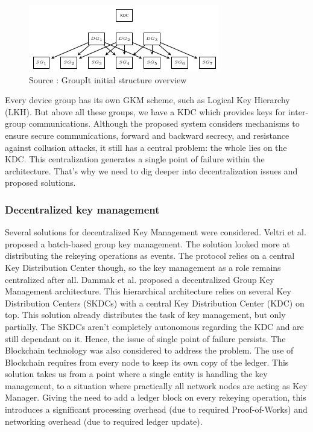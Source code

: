 \begin{figure}[htbp]
	\centerline{\includegraphics[scale=0.75]{figures/groupit.png}}
	\caption{Source \cite{kung_groupit_2018}: GroupIt initial structure overview}
	\label{groupit}
\end{figure}

Every device group has its own GKM scheme, such as Logical Key Hierarchy (LKH). But above all these groups, we have a KDC which provides keys for inter-group communications. Although the proposed system considers mechanisms to ensure secure communications, forward and backward secrecy, and resistance against collusion attacks, it still has a central problem: the whole lies on the KDC. This centralization generates a single point of failure within the architecture. That’s why we need to dig deeper into decentralization issues and proposed solutions.

\subsubsection{Decentralized key management}
\label{subsec:decentralized}

Several solutions for decentralized Key Management were considered. Veltri et al. \cite{veltri_novel_2013} proposed a batch-based group key management. The solution looked more at distributing the rekeying operations as events. The protocol relies on a central Key Distribution Center though, so the key management as a role remains centralized after all. Dammak et al. \cite{dammak_decentralized_2020} proposed a decentralized Group Key Management architecture. This hierarchical architecture relies on several Key Distribution Centers (SKDCs) with a central Key Distribution Center (KDC) on top. This solution already distributes the task of key management, but only partially. The SKDCs aren’t completely autonomous regarding the KDC and are still dependant on it. Hence, the issue of single point of failure persists. The Blockchain technology was also considered \cite{truong_towards_2019, kouicem_decentralized_2019} to address the problem. The use of Blockchain requires from every node to keep its own copy of the ledger. This solution takes us from a point where a single entity is handling the key management, to a situation where practically all network nodes are acting as Key Manager. Giving the need to add a ledger block on every rekeying operation, this introduces a significant processing overhead (due to required Proof-of-Works) and networking overhead (due to required ledger update).

